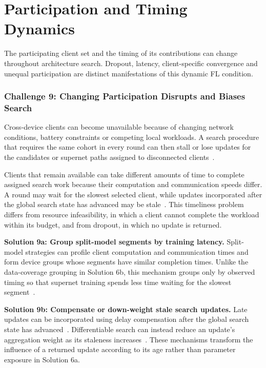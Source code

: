 \section{Participation and Timing Dynamics}

The participating client set and the timing of its contributions can change throughout architecture search. Dropout, latency, client-specific convergence and unequal participation are distinct manifestations of this dynamic FL condition.

\subsubsection{Challenge 9: Changing Participation Disrupts and Biases Search}

Cross-device clients can become unavailable because of changing network conditions, battery constraints or competing local workloads. A search procedure that requires the same cohort in every round can then stall or lose updates for the candidates or supernet paths assigned to disconnected clients~\cite{optimize_fednas_edge_2021}.

Clients that remain available can take different amounts of time to complete assigned search work because their computation and communication speeds differ. A round may wait for the slowest selected client, while updates incorporated after the global search state has advanced may be stale~\cite{nasfly_2024,rl_fednas_2021,fedregnas_2025}. This timeliness problem differs from resource infeasibility, in which a client cannot complete the workload within its budget, and from dropout, in which no update is returned.

\noindent\textbf{Solution 9a: Group split-model segments by training latency.} Split-model strategies can profile client computation and communication times and form device groups whose segments have similar completion times. Unlike the data-coverage grouping in Solution 6b, this mechanism groups only by observed timing so that supernet training spends less time waiting for the slowest segment~\cite{nasfly_2024}.

\noindent\textbf{Solution 9b: Compensate or down-weight stale search updates.} Late updates can be incorporated using delay compensation after the global search state has advanced~\cite{rl_fednas_2021}. Differentiable search can instead reduce an update's aggregation weight as its staleness increases~\cite{fedregnas_2025}. These mechanisms transform the influence of a returned update according to its age rather than parameter exposure in Solution 6a.

